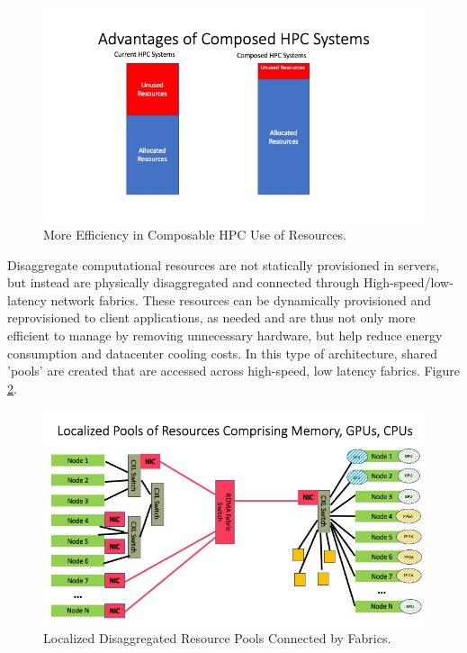 \begin{figure}
\centerline{\includegraphics[width=\columnwidth]{Slide3.jpeg}}
\caption{More Efficiency in Composable HPC Use of Resources.} 
\label{fig:stranded}
\end{figure}

Disaggregate computational resources are not statically provisioned in servers, but instead are physically disaggregated and connected through High-speed/low-latency network fabrics.  These resources can be dynamically provisioned and reprovisioned to client applications, as needed and are thus not only more efficient to manage by removing unnecessary hardware, but help reduce energy consumption and datacenter cooling costs.  In this type of architecture, shared 'pools' are created that are accessed across high-speed, low latency fabrics. Figure \ref{fig:Pools}.  

\begin{figure}
\centerline{\includegraphics[width=\columnwidth]{Slide4.jpeg}}
\caption{Localized Disaggregated Resource Pools Connected by Fabrics.} 
\label{fig:Pools}
\end{figure}
  

